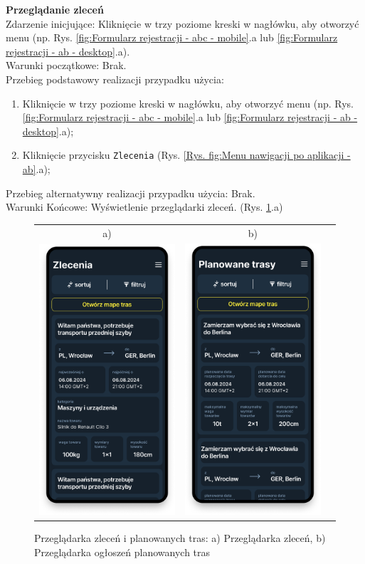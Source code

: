 \textbf{Przeglądanie zleceń} \\
Zdarzenie inicjujące: Kliknięcie w trzy poziome kreski w nagłówku, aby otworzyć menu (np. Rys. \ref{fig:Formularz rejestracji - abc - mobile}.a lub \ref{fig:Formularz rejestracji - ab - desktop}.a). \\
Warunki początkowe: Brak. \\
Przebieg podstawowy realizacji przypadku użycia:
\begin{enumerate}
    \item Kliknięcie w trzy poziome kreski w nagłówku, aby otworzyć menu (np. Rys. \ref{fig:Formularz rejestracji - abc - mobile}.a lub \ref{fig:Formularz rejestracji - ab - desktop}.a);
    \item Kliknięcie przycisku \texttt{Zlecenia} (Rys. \ref{Rys. fig:Menu nawigacji po aplikacji - ab}.a);
\end{enumerate}
Przebieg alternatywny realizacji przypadku użycia: Brak. \\
Warunki Końcowe: Wyświetlenie przeglądarki zleceń. (Rys. \ref{Rys. fig:Przeglądarka zleceń i planowanych tras - ab}.a)
\begin{figure}[H]
	\centering
	\begin{tabular}{@{}ccc@{}}
            a) & b)\\
    \includegraphics[width=0.3\linewidth]{rozdzial1/zlecenia.png} &
    \includegraphics[width=0.3\linewidth]{rozdzial1/planowane_trasy.png}
    \end{tabular}
    \caption{Przeglądarka zleceń i planowanych tras: a) Przeglądarka zleceń, b) Przeglądarka ogłoszeń planowanych tras}
	\label{Rys. fig:Przeglądarka zleceń i planowanych tras - ab}
\end{figure}
\label{Przeglądanie ogłoszeń planowanych tras}

